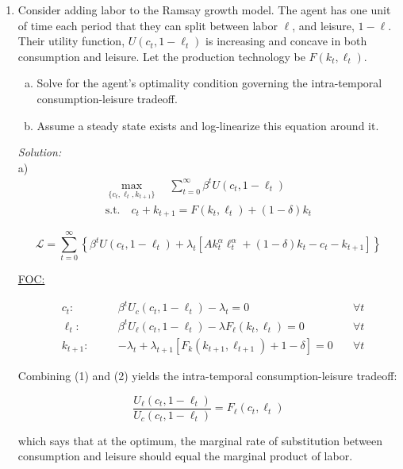 \documentclass[12pt]{article}
\newif\ifsln
\begin{document}
\begin{enumerate}[1.]
\fi



\item Consider adding labor to the Ramsay growth model. The agent has one unit of time each period that they can split between labor $\ell$, and leisure, $1-\ell$. Their utility function, $U(c_{t}, 1 - \ell_{t})$ is increasing and concave in both consumption and leisure. Let the production technology be $F(k_{t}, \ell_{t})$. 
	\begin{enumerate}[a)]
		\item Solve for the agent's optimality condition governing the intra-temporal consumption-leisure tradeoff.
		\item Assume a steady state exists and log-linearize this equation around it.
	\end{enumerate}

\ifsln
\textit{Solution:}\\
a)
\begin{gather*}
\underset{\{c_{t}, \ell_{t}, k_{t+1}\}}{\max} \quad \sum_{t=0}^{\infty} \beta^{t} U(c_{t}, 1 - \ell_{t})\\
\text{s.t.} \quad c_{t} + k_{t+1} = F(k_{t}, \ell_{t}) + (1-\delta)k_{t}
\end{gather*}

\[\mathcal{L} = \sum_{t=0}^{\infty}\left\{  \beta^{t} U(c_{t}, 1 - \ell_{t})  + \lambda_{t}[ Ak_{t}^{\alpha}\ell_{t}^{\alpha} + (1-\delta)k_{t} - c_{t} - k_{t+1} ]  \right\}\]

\underline{FOC:}

\begin{align}
&c_{t}:&\quad& \beta^{t} U_{c}(c_{t}, 1-\ell_{t}) - \lambda_{t} = 0 \quad &\forall t\\
&\ell_{t}:&\quad& \beta^{t} U_{\ell}(c_{t}, 1-\ell_{t}) - \lambda F_{\ell}(k_{t}, \ell_{t}) = 0 \quad &\forall t\\
&k_{t+1}:&\quad& -\lambda_{t} + \lambda_{t+1}\left[ F_{k}(k_{t+1}, \ell_{t+1}) + 1 - \delta \right] = 0 \quad & \forall t
\end{align}

Combining (1) and (2) yields the intra-temporal consumption-leisure tradeoff:

\[ \frac{U_{\ell}(c_{t}, 1-\ell_{t})}{U_{c}(c_{t}, 1-\ell_{t})} = F_{\ell}(c_{t}, \ell_{t})\]

which says that at the optimum, the marginal rate of substitution between consumption and leisure should equal the marginal product of labor.\\


\end{enumerate}
\end{document}
